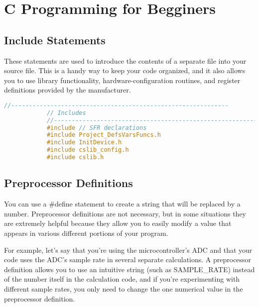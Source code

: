 %
%
%
%
%


\chapter{C Programming for Begginers}

    \section{Include Statements}
        These statements are used to introduce the contents of a separate file into your source file. This is a handy way to keep your code organized, and it also allows you to use library functionality, hardware-configuration routines, and register definitions provided by the manufacturer.
    
            \begin{lstlisting}[backgroundcolor = \color{lightgray}, language=c]
            //-------------------------------------------------------------
            // Includes
            //-------------------------------------------------------------
            #include // SFR declarations
            #include Project_DefsVarsFuncs.h
            #include InitDevice.h
            #include cslib_config.h
            #include cslib.h
            \end{lstlisting}

\section{Preprocessor Definitions}

    You can use a \#define statement to create a string that will be replaced by a number. Preprocessor definitions are not necessary, but in some situations they are extremely helpful because they allow you to easily modify a value that appears in various different portions of your program.
    
    
    For example, let’s say that you’re using the microcontroller’s ADC and that your code uses the ADC’s sample rate in several separate calculations. A preprocessor definition allows you to use an intuitive string (such as SAMPLE\_RATE) instead of the number itself in the calculation code, and if you’re experimenting with different sample rates, you only need to change the one numerical value in the preprocessor definition.
    
